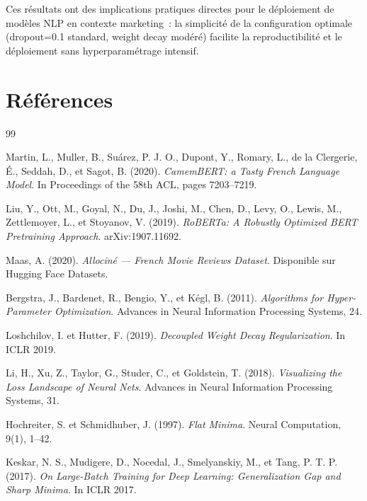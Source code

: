 \documentclass[12pt,a4paper]{article}
\begin{document}
Ces résultats ont des implications pratiques directes pour le déploiement de
modèles NLP en contexte marketing~: la simplicité de la configuration optimale
(dropout=0.1 standard, weight decay modéré) facilite la reproductibilité et
le déploiement sans hyperparamétrage intensif.

\newpage
\section*{Références}

\begin{thebibliography}{99}

Martin, L., Muller, B., Suárez, P. J. O., Dupont, Y., Romary, L.,
de la Clergerie, É., Seddah, D., et Sagot, B. (2020).
\textit{CamemBERT: a Tasty French Language Model}.
In Proceedings of the 58th ACL, pages 7203–7219.

Liu, Y., Ott, M., Goyal, N., Du, J., Joshi, M., Chen, D., Levy, O.,
Lewis, M., Zettlemoyer, L., et Stoyanov, V. (2019).
\textit{RoBERTa: A Robustly Optimized BERT Pretraining Approach}.
arXiv:1907.11692.

Maas, A. (2020).
\textit{Allociné — French Movie Reviews Dataset}.
Disponible sur Hugging Face Datasets.

Bergstra, J., Bardenet, R., Bengio, Y., et Kégl, B. (2011).
\textit{Algorithms for Hyper-Parameter Optimization}.
Advances in Neural Information Processing Systems, 24.

Loshchilov, I. et Hutter, F. (2019).
\textit{Decoupled Weight Decay Regularization}.
In ICLR 2019.

Li, H., Xu, Z., Taylor, G., Studer, C., et Goldstein, T. (2018).
\textit{Visualizing the Loss Landscape of Neural Nets}.
Advances in Neural Information Processing Systems, 31.

Hochreiter, S. et Schmidhuber, J. (1997).
\textit{Flat Minima}.
Neural Computation, 9(1), 1–42.

Keskar, N. S., Mudigere, D., Nocedal, J., Smelyanskiy, M., et Tang, P. T. P. (2017).
\textit{On Large-Batch Training for Deep Learning: Generalization Gap and Sharp Minima}.
In ICLR 2017.


\end{thebibliography}
\end{document}

